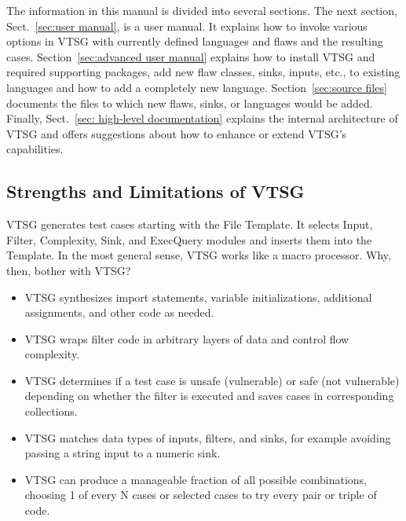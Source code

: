 The information in this manual is divided into several sections.  The next section,
Sect.~\ref{sec:user manual}, is a user manual.  It explains how to invoke various
options in VTSG with currently defined languages and flaws and the resulting cases.
Section~\ref{sec:advanced user manual} explains how to install VTSG and required
supporting packages, add new flaw classes, sinks, inputs, etc., to
existing languages
and how to add a completely new language.
Section~\ref{sec:source files} documents the files to which new flaws, sinks, or
languages would be added.
Finally, Sect.~\ref{sec: high-level documentation} explains the internal architecture
of VTSG
and offers suggestions about how to enhance or extend VTSG's capabilities.

\subsection{Strengths and Limitations of VTSG}

VTSG generates test cases starting with the File Template.  It selects Input,
Filter, Complexity, Sink, and ExecQuery modules and inserts them into the Template.
In the most general sense, VTSG works like a macro processor.  Why, then, bother with
VTSG?
\begin{itemize}
  \item VTSG synthesizes import statements, variable initializations, additional
    assignments, and other code as needed.
  \item VTSG wraps filter code in arbitrary layers of data and control flow
    complexity.
  \item VTSG determines if a test case is unsafe (vulnerable) or safe (not
    vulnerable) depending on whether the filter is executed and saves cases in
    corresponding collections.
  \item VTSG matches data types of inputs, filters, and sinks, for example avoiding
    passing a string input to a numeric sink.
  \item VTSG can produce a manageable fraction of all possible combinations, choosing
    1 of every N cases or selected cases to try every pair or triple of code.
\end{itemize}

